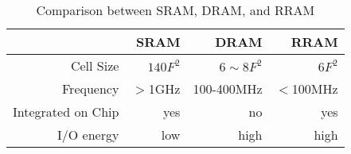 \begin{table}[htbp]
    \centering
    \caption{Comparison between SRAM, DRAM, and RRAM}
      \begin{tabular}{|r|r|r|r|}
      \hline
            & SRAM  & DRAM  & RRAM \\
      \hline
      Cell Size & $140F^2$ & $6\sim8F^2$ & $6F^2$ \\
      \hline
      Frequency & $>$1GHz & 100-400MHz & $<$100MHz \\
      \hline
      Integrated on Chip & yes   & no    & yes \\
      \hline
      I/O energy & low   & high  & high \\
      \hline
      \end{tabular}
    \label{tab:ram}
\end{table}